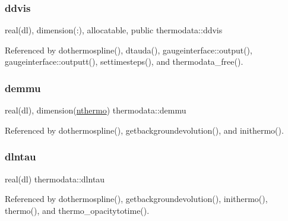 \mbox{\label{namespacethermodata_aeab1ddb31ee9b39dd71d1a5a833b85f6}} 
\subsubsection{\texorpdfstring{ddvis}{ddvis}}
{\footnotesize\ttfamily real(dl), dimension(\+:), allocatable, public thermodata\+::ddvis}



Referenced by dothermospline(), dtauda(), gaugeinterface\+::output(), gaugeinterface\+::outputt(), settimesteps(), and thermodata\+\_\+free().

\mbox{\label{namespacethermodata_a01e420c8859c753a39ea78e4afe151a4}} 
\subsubsection{\texorpdfstring{demmu}{demmu}}
{\footnotesize\ttfamily real(dl), dimension(\mbox{\hyperlink{namespacethermodata_ab5a6325bede2b0cce4e867e9e1e18215}{nthermo}}) thermodata\+::demmu\hspace{0.3cm}{\ttfamily [private]}}



Referenced by dothermospline(), getbackgroundevolution(), and inithermo().

\mbox{\label{namespacethermodata_a9a43caa2003542f5a28e6f2280515365}} 
\subsubsection{\texorpdfstring{dlntau}{dlntau}}
{\footnotesize\ttfamily real(dl) thermodata\+::dlntau\hspace{0.3cm}{\ttfamily [private]}}



Referenced by dothermospline(), getbackgroundevolution(), inithermo(), thermo(), and thermo\+\_\+opacitytotime().

\mbox{\label{namespacethermodata_aa627075f6104ddf2acd8968688ec6f7e}} 
